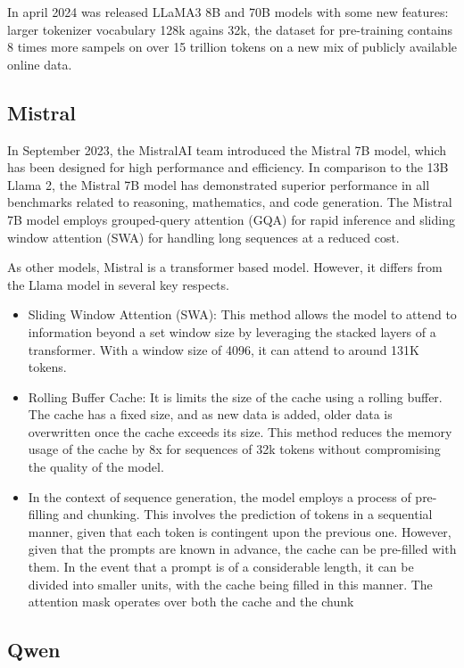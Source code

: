 \documentclass[PMI,VKR]{HSEUniversity}
\begin{document}
\newpage
In april 2024 was released LLaMA3 8B and 70B models with some new features: larger tokenizer vocabulary 128k agains 32k, the dataset for pre-training contains 8 times more sampels on over 15 trillion tokens on a new mix of publicly available online data.   


\subsection{Mistral}

In September 2023, the MistralAI \cite{mistral:2023} team introduced the Mistral 7B model, which has been designed for high performance and efficiency. 
In comparison to the 13B Llama 2, the Mistral 7B model has demonstrated superior performance in all benchmarks related to reasoning, mathematics, and code generation. 
The Mistral 7B model employs grouped-query attention (GQA) for rapid inference and sliding window attention (SWA) for handling long sequences at a reduced cost.

As other models, Mistral is a transformer based model. However, it differs from the Llama model in several key respects.
\begin{itemize}
    \item Sliding Window Attention (SWA): This method allows the model to attend to information beyond a set window size by leveraging the stacked layers of a transformer. 
    With a window size of 4096, it can attend to around 131K tokens. 
    \item Rolling Buffer Cache: It is limits the size of the cache using a rolling buffer. The cache has a fixed size, and as new data is added, older data is overwritten once the cache exceeds its size. 
    This method reduces the memory usage of the cache by 8x for sequences of 32k tokens without compromising the quality of the model.
    \item In the context of sequence generation, the model employs a process of pre-filling and chunking. 
    This involves the prediction of tokens in a sequential manner, given that each token is contingent upon the previous one. However, given that the prompts are known in advance, the cache can be pre-filled with them. 
    In the event that a prompt is of a considerable length, it can be divided into smaller units, with the cache being filled in this manner. 
    The attention mask operates over both the cache and the chunk
\end{itemize}

\subsection{Qwen}
\end{document}
